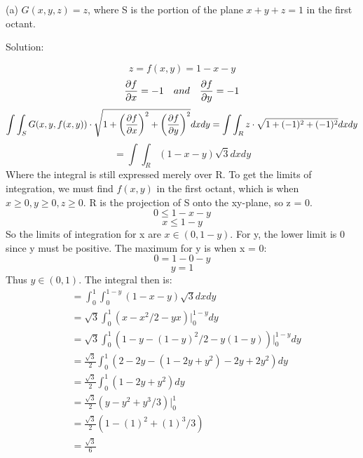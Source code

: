 \documentclass{article}
\begin{document}
\begin{enumerate}
    (a) $G(x,y,z) = z$, where S is the portion of the plane $x + y + z = 1$ in the first
    octant.

    Solution:

    \[ z = f(x,y) = 1-x-y \]
    \[ \frac{\partial{f}}{\partial{x}} = -1 \quad and \quad \frac{\partial{f}}{\partial{y}} = -1 \]
    \[ \int\int_S{G(x,y,f(x,y))} \cdot \sqrt{1 + {\left( \frac{\partial{f}}{\partial{x}} \right)}^2 + {\left( \frac{\partial{f}}{\partial{y}} \right)}^2}dxdy = \int\int_R{z} \cdot \sqrt{1 + (-1)^2 + (-1)^2}dxdy \]
    \[ = \int\int_R{(1 - x - y)}\sqrt{3}dxdy \]
    Where the integral is still expressed merely over R. To get the limits of integration, we must find
    $f(x,y)$ in the first octant, which is when $x \ge 0,  y \ge 0, z \ge 0$. R is the projection of S
    onto the xy-plane, so z = 0.
    \[ 0 \le 1-x-y \]
    \[ x \le 1-y \]
    So the limits of integration for x are $x \in (0,1-y)$. For y, the lower limit is 0 since y must
    be positive. The maximum for y is when x = 0:
    \[ 0 = 1 - 0 - y \]
    \[ y = 1 \]
    Thus $y \in (0,1)$. The integral then is:
    \begin{align*}
        &= \int_0^1\int_0^{1-y}{(1 - x - y)}\sqrt{3}dxdy \\
        &= \sqrt{3}\int_0^1{(x - x^2/2 - yx)}|_0^{1-y}dy \\
        &= \sqrt{3}\int_0^1{(1-y - (1-y)^2/2 - y(1-y))}|_0^{1-y}dy \\
        &= \frac{\sqrt{3}}{2}\int_0^1{(2-2y - (1-2y+y^2) - 2y + 2y^2)}dy \\
        &= \frac{\sqrt{3}}{2}\int_0^1{(1 - 2y + y^2)}dy \\
        &= \frac{\sqrt{3}}{2}{(y - y^2 + y^3/3)}|_0^1 \\
        &= \frac{\sqrt{3}}{2}{(1 - (1)^2 + (1)^3/3)} \\
        &= \frac{\sqrt{3}}{6} \\
    \end{align*}


\end{enumerate}
\end{document}

